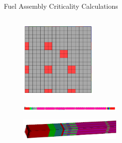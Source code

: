 \documentclass{beamer}
\begin{document}
\begin{frame}{Fuel Assembly Criticality Calculations}

  \begin{columns}

    \begin{column}{0.5\textwidth}

      \begin{figure}[htpb!]
        \begin{center}
          \includegraphics[width=1.5in]{problem3_radial_mat.png}
        \end{center}
      \end{figure}

      \begin{figure}[htbp!]
        \begin{center}
          \includegraphics[width=2in]{problem3_axial_mat.png}
        \end{center}
      \end{figure}

      \begin{figure}[htpb!]
        \begin{center}
          \includegraphics[width=2in]{problem3_end.png}
        \end{center}
      \end{figure}

    \end{column}


\end{columns}
\end{frame}
\end{document}
